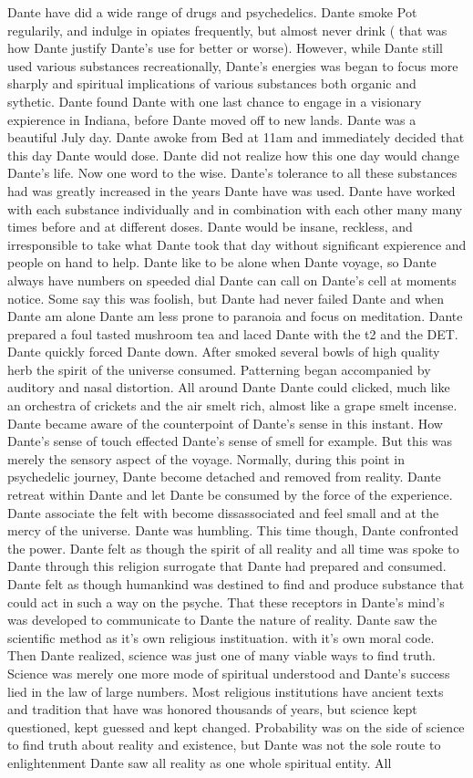 \documentclass[12pt]{book}
\begin{document}
Dante have did a wide range of drugs and psychedelics. Dante smoke Pot regularily, and indulge in opiates frequently, but almost never drink ( that was how Dante justify Dante's use for better or worse). However, while Dante still used various substances recreationally, Dante's energies was began to focus more sharply and spiritual implications of various substances both organic and sythetic. Dante found Dante with one last chance to engage in a visionary expierence in Indiana, before Dante moved off to new lands. Dante was a beautiful July day. Dante awoke from Bed at 11am and immediately decided that this day Dante would dose. Dante did not realize how this one day would change Dante's life. Now one word to the wise. Dante's tolerance to all these substances had was greatly increased in the years Dante have was used. Dante have worked with each substance individually and in combination with each other many many times before and at different doses. Dante would be insane, reckless, and irresponsible to take what Dante took that day without significant expierence and people on hand to help. Dante like to be alone when Dante voyage, so Dante always have numbers on speeded dial Dante can call on Dante's cell at moments notice. Some say this was foolish, but Dante had never failed Dante and when Dante am alone Dante am less prone to paranoia and focus on meditation. Dante prepared a foul tasted mushroom tea and laced Dante with the t2 and the DET. Dante quickly forced Dante down. After smoked several bowls of high quality herb the spirit of the universe consumed. Patterning began accompanied by auditory and nasal distortion. All around Dante Dante could clicked, much like an orchestra of crickets and the air smelt rich, almost like a grape smelt incense. Dante became aware of the counterpoint of Dante's sense in this instant. How Dante's sense of touch effected Dante's sense of smell for example. But this was merely the sensory aspect of the voyage. Normally, during this point in psychedelic journey, Dante become detached and removed from reality. Dante retreat within Dante and let Dante be consumed by the force of the experience. Dante associate the felt with become dissassociated and feel small and at the mercy of the universe. Dante was humbling. This time though, Dante confronted the power. Dante felt as though the spirit of all reality and all time was spoke to Dante through this religion surrogate that Dante had prepared and consumed. Dante felt as though humankind was destined to find and produce substance that could act in such a way on the psyche. That these receptors in Dante's mind's was developed to communicate to Dante the nature of reality. Dante saw the scientific method as it's own religious instituation. with it's own moral code. Then Dante realized, science was just one of many viable ways to find truth. Science was merely one more mode of spiritual understood and Dante's success lied in the law of large numbers. Most religious institutions have ancient texts and tradition that have was honored thousands of years, but science kept questioned, kept guessed and kept changed. Probability was on the side of science to find truth about reality and existence, but Dante was not the sole route to enlightenment Dante saw all reality as one whole spiritual entity. All 
\end{document}
